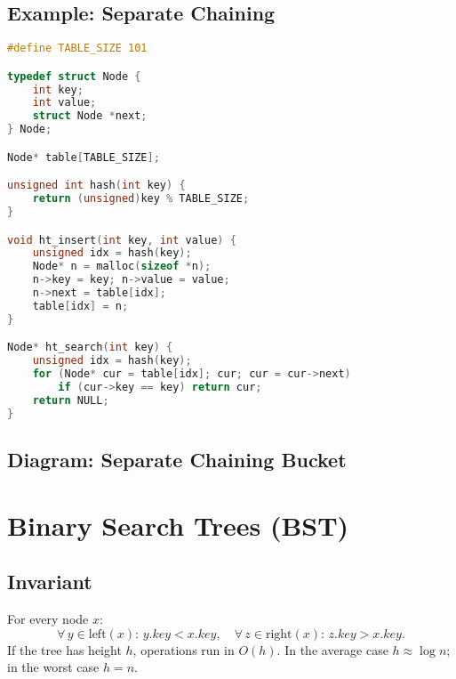 \documentclass[12pt]{article}
\begin{document}
\subsection*{Example: Separate Chaining}
\begin{lstlisting}[language=C]
#define TABLE_SIZE 101

typedef struct Node {
    int key;
    int value;
    struct Node *next;
} Node;

Node* table[TABLE_SIZE];

unsigned int hash(int key) {
    return (unsigned)key % TABLE_SIZE;
}

void ht_insert(int key, int value) {
    unsigned idx = hash(key);
    Node* n = malloc(sizeof *n);
    n->key = key; n->value = value;
    n->next = table[idx];
    table[idx] = n;
}

Node* ht_search(int key) {
    unsigned idx = hash(key);
    for (Node* cur = table[idx]; cur; cur = cur->next)
        if (cur->key == key) return cur;
    return NULL;
}
\end{lstlisting}

\subsection*{Diagram: Separate Chaining Bucket}
\begin{center}
\end{center}

\newpage
\section{Binary Search Trees (BST)}
\subsection*{Invariant}
For every node \(x\):
\[
  \forall\,y\in\text{left}(x):\,y.\mathit{key} < x.\mathit{key},\quad
  \forall\,z\in\text{right}(x):\,z.\mathit{key} > x.\mathit{key}.
\]
If the tree has height \(h\), operations run in \(O(h)\).  In the average case \(h \approx \log n\); in the worst case \(h = n\).
\end{document}
